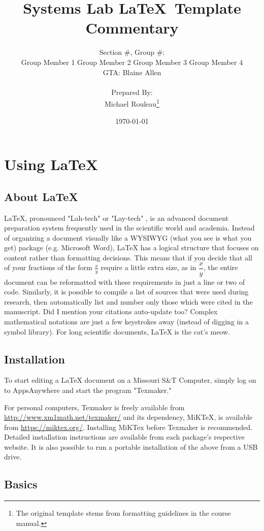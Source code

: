 \documentclass[11pt,letter]{report}
\title{\Huge{Systems Lab \LaTeX\ Template Commentary}}
\author{Section \#, Group \#: \\
  Group Member 1 \quad Group Member 2 \quad Group Member 3 \quad Group Member 4 \\ GTA: Blaine Allen \\\\ Prepared By: \\ Michael Rouleau\thanks{The original template stems from formatting guidelines in the course manual\cite{Stutts}.}}
\date{\today}
\begin{document}
\maketitle

\chapter{Using \LaTeX{}} \label{chap:usinglatex}
	\section{About \LaTeX{}}
	\LaTeX{}, pronounced "Lah-tech" or "Lay-tech" \cite{Lamport}, is an advanced document preparation system frequently used in the scientific world and academia. Instead of organizing a document visually like a WYSIWYG (what you see is what you get) package (e.g. Microsoft Word), \LaTeX{} has a logical structure that focuses on content rather than formatting decisions. This means that if you decide that all of your fractions of the form $\tfrac{x}{y}$ require a little extra size, as in $\dfrac{x}{y}$, the entire document can be reformatted with these requirements in just a line or two of code. Similarly, it is possible to compile a list of sources that were used during research, then automatically list and number only those which were cited in the manuscript. Did I mention your citations auto-update too? Complex mathematical notations are just a few keystrokes away (instead of digging in a symbol library). For long scientific documents, \LaTeX{} is the cat's meow.
	
	\section{Installation} \label{sect:install}
	To start editing a \LaTeX{} document on a Missouri S\&T Computer, simply log on to AppsAnywhere and start the program "Texmaker."
	
	For personal computers, Texmaker is freely available from \url{http://www.xm1math.net/texmaker/} and its dependency, MiKTeX, is available from \url{https://miktex.org/}. Installing MiKTex before Texmaker is recommended. Detailed installation instructions are available from each package's respective website. It is also possible to run a portable installation of the above from a USB drive.
	
	\section{Basics} \label{sect:basics}
\end{document}
